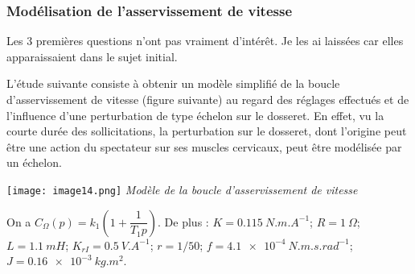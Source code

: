 \begin{multicols}{2}
%
%
%
%
%
%
%
%


\subsubsection*{Modélisation de l'asservissement de vitesse}
\ifprof
\else

\begin{rem}
Les 3 premières questions n'ont pas vraiment d'intérêt. Je les ai laissées car elles apparaissaient dans le sujet initial.
\end{rem}

L'étude suivante consiste à obtenir un modèle simplifié de la boucle
d'asservissement de vitesse (figure suivante) au regard des réglages effectués
et de l'influence d'une perturbation de type échelon sur le dosseret. En
effet, vu la courte durée des sollicitations, la perturbation sur le
dosseret, dont l'origine peut être une action du spectateur sur ses
muscles cervicaux, peut être modélisée par un échelon.

\begin{center}
\texttt{[image: image14.png]}
\textit{Modèle de la boucle d'asservissement de vitesse \label{fig13}}
\end{center}

 On a \(C_{\Omega}\left( p \right) = k_{1}\left( 1 + \dfrac{1}{T_{1}p} \right)\). De plus : 
$K = \SI{0,115}{N.m.A^{-1}}$;
$R = \SI{1}{\Omega}$;
$L = \SI{1,1}{mH}$;
$K_{rI}= \SI{0,5}{V. A^{-1}}$;
$r = 1/50$;
$f = \SI{4.1e-4}{N.m.s.rad^{-1}}$;
$J=\SI{0,16e-3}{kg.m^{2}}$.


\end{multicols}
